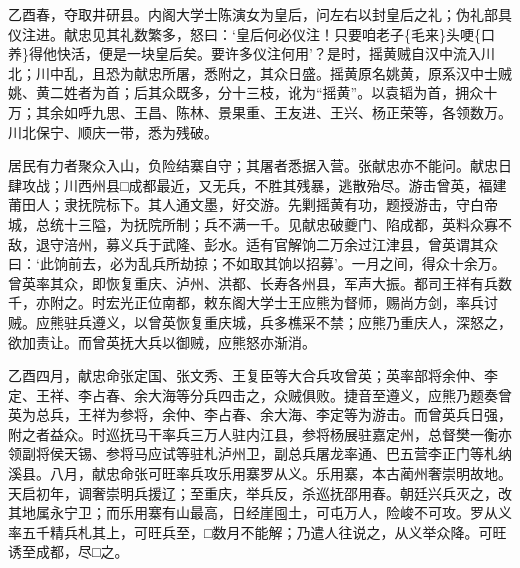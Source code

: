 \documentclass[]{article}
\begin{document}
乙酉春，夺取井研县。内阁大学士陈演女为皇后，问左右以封皇后之礼；伪礼部具仪注进。献忠见其礼数繁多，怒曰：`皇后何必仪注！只要咱老子\{毛来\}头哽\{口养\}得他快活，便是一块皇后矣。要许多仪注何用'？是时，摇黄贼自汉中流入川北；川中乱，且恐为献忠所屠，悉附之，其众日盛。摇黄原名姚黄，原系汉中士贼姚、黄二姓者为首；后其众既多，分十三枝，讹为``摇黄''。以袁韬为首，拥众十万；其余如呼九思、王昌、陈林、景果重、王友进、王兴、杨正荣等，各领数万。川北保宁、顺庆一带，悉为残破。

居民有力者聚众入山，负险结寨自守；其屠者悉据入营。张献忠亦不能问。献忠日肆攻战；川西州县□成都最近，又无兵，不胜其残暴，逃散殆尽。游击曾英，福建莆田人；隶抚院标下。其人通文墨，好交游。先剿摇黄有功，题授游击，守白帝城，总统十三隘，为抚院所制；兵不满一千。见献忠破夔门、陷成都，英料众寡不敌，退守涪州，募义兵于武隆、彭水。适有官解饷二万余过江津县，曾英谓其众曰：`此饷前去，必为乱兵所劫掠；不如取其饷以招募'。一月之间，得众十余万。曾英率其众，即恢复重庆、泸州、洪都、长寿各州县，军声大振。都司王祥有兵数千，亦附之。时宏光正位南都，敕东阁大学士王应熊为督师，赐尚方剑，率兵讨贼。应熊驻兵遵义，以曾英恢复重庆城，兵多樵采不禁；应熊乃重庆人，深怒之，欲加责让。而曾英抚大兵以御贼，应熊怒亦渐消。

乙酉四月，献忠命张定国、张文秀、王复臣等大合兵攻曾英；英率部将余仲、李定、王祥、李占春、余大海等分兵四击之，众贼俱败。捷音至遵义，应熊乃题奏曾英为总兵，王祥为参将，余仲、李占春、余大海、李定等为游击。而曾英兵日强，附之者益众。时巡抚马干率兵三万人驻内江县，参将杨展驻嘉定州，总督樊一衡亦领副将侯天锡、参将马应试等驻札泸州卫，副总兵屠龙率通、巴五营李正门等札纳溪县。八月，献忠命张可旺率兵攻乐用寨罗从义。乐用寨，本古蔺州奢崇明故地。天启初年，调奢崇明兵援辽；至重庆，举兵反，杀巡抚邵用春。朝廷兴兵灭之，改其地属永宁卫；而乐用寨有山最高，日经崖囤土，可屯万人，险峻不可攻。罗从义率五千精兵札其上，可旺兵至，□数月不能解；乃遣人往说之，从义举众降。可旺诱至成都，尽□之。
\end{document}
